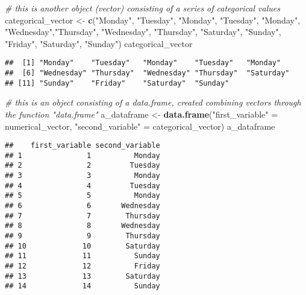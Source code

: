\documentclass[
]{article}
\newenvironment{Shaded}{\begin{snugshade}}{\end{snugshade}}
\newcommand{\CommentTok}[1]{\textcolor[rgb]{0.56,0.35,0.01}{\textit{#1}}}
\newcommand{\FunctionTok}[1]{\textcolor[rgb]{0.13,0.29,0.53}{\textbf{#1}}}
\newcommand{\NormalTok}[1]{#1}
\newcommand{\OtherTok}[1]{\textcolor[rgb]{0.56,0.35,0.01}{#1}}
\newcommand{\StringTok}[1]{\textcolor[rgb]{0.31,0.60,0.02}{#1}}
\begin{document}
\begin{Shaded}
\begin{Highlighting}[]
\CommentTok{\# this is another object (vector) consisting of a series of categorical values}
\NormalTok{categorical\_vector }\OtherTok{\textless{}{-}} \FunctionTok{c}\NormalTok{(}\StringTok{"Monday"}\NormalTok{, }\StringTok{"Tuesday"}\NormalTok{, }\StringTok{"Monday"}\NormalTok{, }\StringTok{"Tuesday"}\NormalTok{, }\StringTok{"Monday"}\NormalTok{, }\StringTok{"Wednesday"}\NormalTok{,}\StringTok{"Thursday"}\NormalTok{, }\StringTok{"Wednesday"}\NormalTok{, }\StringTok{"Thursday"}\NormalTok{, }\StringTok{"Saturday"}\NormalTok{, }\StringTok{"Sunday"}\NormalTok{, }\StringTok{"Friday"}\NormalTok{, }\StringTok{"Saturday"}\NormalTok{, }\StringTok{"Sunday"}\NormalTok{)}
\NormalTok{categorical\_vector}
\end{Highlighting}
\end{Shaded}

\begin{verbatim}
##  [1] "Monday"    "Tuesday"   "Monday"    "Tuesday"   "Monday"   
##  [6] "Wednesday" "Thursday"  "Wednesday" "Thursday"  "Saturday" 
## [11] "Sunday"    "Friday"    "Saturday"  "Sunday"
\end{verbatim}

\begin{Shaded}
\begin{Highlighting}[]
\CommentTok{\# this is an object consisting of a data.frame, created combining vectors through the function "data.frame"}
\NormalTok{a\_dataframe }\OtherTok{\textless{}{-}} \FunctionTok{data.frame}\NormalTok{(}\StringTok{"first\_variable"} \OtherTok{=}\NormalTok{ numerical\_vector,}
                          \StringTok{"second\_variable"} \OtherTok{=}\NormalTok{ categorical\_vector)}
\NormalTok{a\_dataframe}
\end{Highlighting}
\end{Shaded}

\begin{verbatim}
##    first_variable second_variable
## 1               1          Monday
## 2               2         Tuesday
## 3               3          Monday
## 4               4         Tuesday
## 5               5          Monday
## 6               6       Wednesday
## 7               7        Thursday
## 8               8       Wednesday
## 9               9        Thursday
## 10             10        Saturday
## 11             11          Sunday
## 12             12          Friday
## 13             13        Saturday
## 14             14          Sunday
\end{verbatim}
\end{document}

